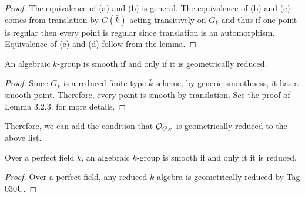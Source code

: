 \documentclass[12pt]{article}
\begin{document}
\begin{proof}
The equivalence of (a) and (b) is general. The equivalence of (b) and (c) comes from translation by $G(\bar{k})$ acting transitively on $G_{\bar{k}}$ and thus if one point is regular then every point is regular since translation is an automorphism. Equivalence of (c) and (d) follow from the lemma. 
\end{proof}

\begin{prop}
An algebraic $k$-group is smooth if and only if it is geometrically reduced.
\end{prop}

\begin{proof}
Since $G_{\bar{k}}$ is a reduced finite type $\bar{k}$-scheme, by generic smoothness, it has a smooth point. Therefore, every point is smooth by translation. See the proof of Lemma 3.2.3. for more details.
\end{proof}

\begin{rmk}
Therefore, we can add the condition that $\mathcal{O}_{G, e}$ is geometrically reduced to the above list.
\end{rmk}

\begin{cor}
Over a perfect field $k$, an algebraic $k$-group is smooth if and only it it is reduced.
\end{cor}

\begin{proof}
Over a perfect field, any reduced $k$-algebra is geometrically reduced by Tag 030U.
\end{proof}
\end{document}
